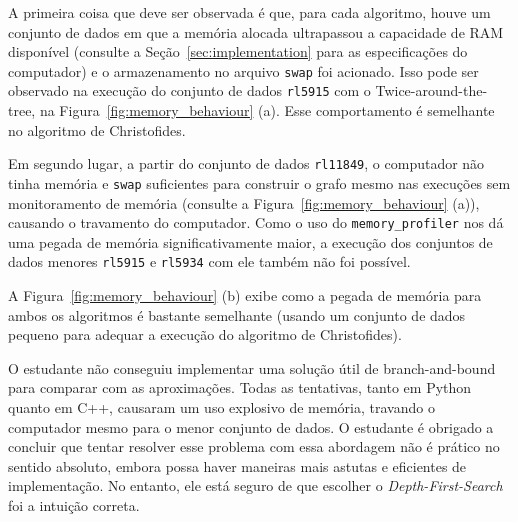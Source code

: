 A primeira coisa que deve ser observada é que, para cada algoritmo, houve um conjunto de dados em que a memória alocada ultrapassou a capacidade de RAM disponível (consulte a Seção~\ref{sec:implementation} para as especificações do computador) e o armazenamento no arquivo \texttt{swap} \footnotemark foi acionado. Isso pode ser observado na execução do conjunto de dados \texttt{rl5915} com o Twice-around-the-tree, na Figura~\ref{fig:memory_behaviour} (a). Esse comportamento é semelhante no algoritmo de Christofides.


Em segundo lugar, a partir do conjunto de dados \texttt{rl11849}, o computador não tinha memória e \texttt{swap} suficientes para construir o grafo mesmo nas execuções sem monitoramento de memória (consulte a Figura~\ref{fig:memory_behaviour} (a)), causando o travamento do computador\footnotemark. Como o uso do \texttt{memory\_profiler} nos dá uma pegada de memória significativamente maior, a execução dos conjuntos de dados menores \texttt{rl5915} e \texttt{rl5934} com ele também não foi possível.


A Figura~\ref{fig:memory_behaviour} (b) exibe como a pegada de memória para ambos os algoritmos é bastante semelhante (usando um conjunto de dados pequeno para adequar a execução do algoritmo de Christofides).

O estudante não conseguiu implementar uma solução útil de branch-and-bound para comparar com as aproximações. Todas as tentativas, tanto em Python quanto em C++, causaram um uso explosivo de memória, travando o computador mesmo para o menor conjunto de dados. O estudante é obrigado a concluir que tentar resolver esse problema com essa abordagem não é prático no sentido absoluto, embora possa haver maneiras mais astutas e eficientes de implementação. No entanto, ele está seguro de que escolher o \textit{Depth-First-Search} foi a intuição correta.

